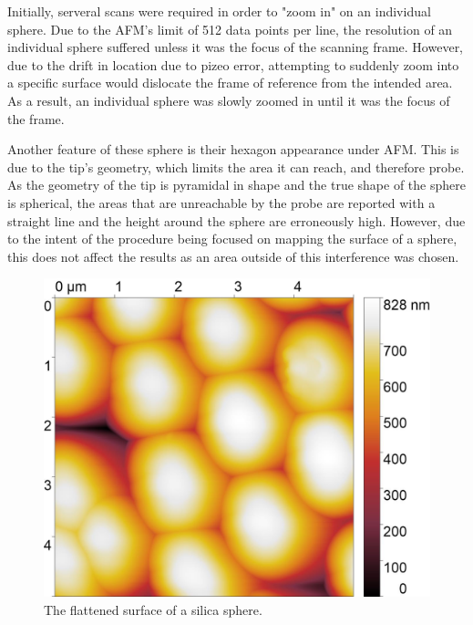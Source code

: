 Initially, serveral scans were required in order to "zoom in" on an individual sphere. Due to the AFM's limit of 512 data points per line, the resolution of an individual sphere suffered unless it was the focus of the scanning frame. However, due to the drift in location due to pizeo error, attempting to suddenly zoom into a specific surface would dislocate the frame of reference from the intended area. As a result, an individual sphere was slowly zoomed in until it was the focus of the frame.

Another feature of these sphere is their hexagon appearance under AFM. This is due to the tip's geometry, which limits the area it can reach, and therefore probe. As the geometry of the tip is pyramidal in shape and the true shape of the sphere is spherical, the areas that are unreachable by the probe are reported with a straight line and the height around the sphere are erroneously high. However, due to the intent of the procedure being focused on mapping the surface of a sphere, this does not affect the results as an area outside of this interference was chosen.

\begin{figure}[h]     %
        \begin{center}
          \includegraphics[width=130mm]{chapter3/5umareat2.jpg}
\end{center}
\caption{The flattened surface of a silica sphere.}
\label{fig:Sili2}                 %
\end{figure}



